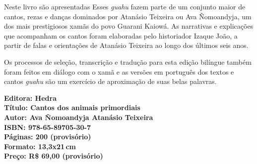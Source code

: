 \noindent{}Neste livro são apresentadas  Esses \textit{guahu} fazem parte de um conjunto maior de cantos, rezas e danças dominados por Atanásio Teixeira ou Ava Ñomoandyja, um dos mais prestigiosos xamãs do povo Guarani Kaiowá. As narrativas e explicações que acompanham os cantos foram elaboradas pelo historiador Izaque João, a partir de falas e orientações de Atanásio Teixeira ao longo dos últimos seis anos. 

Os processos de seleção, transcrição e tradução para esta edição bilíngue também foram feitos em diálogo com o xamã e as versões em português dos textos e cantos \textit{guahu} são um exercício de aproximação de suas belas palavras.

\vfill
\noindent\begin{minipage}[c]{1\linewidth}
{\small\textbf{
\hspace*{-.1cm}Editora: Hedra\\
Título: Cantos dos animais primordiais\\
Autor: Ava Ñomoandyja Atanásio Teixeira\\ 
ISBN: 978-65-89705-30-7\\
Páginas: 200 (provisório)\\
Formato: 13,3x21\,cm\\
Preço: R\$ 69,00 (provisório)\\
}}
\end{minipage}
\pagebreak



